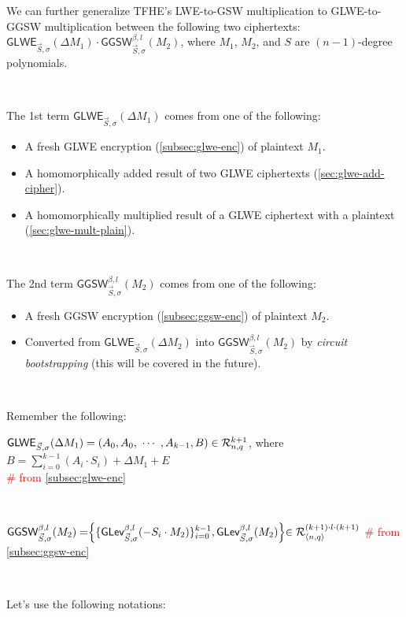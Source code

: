 We can further generalize TFHE's LWE-to-GSW multiplication to GLWE-to-GGSW multiplication between the following two ciphertexts: $\textsf{GLWE}_{\vec{S}, \sigma}(\Delta M_1) \cdot \textsf{GGSW}_{\vec{S}, \sigma}^{\beta, l}(M_2)$, where $M_1$, $M_2$, and $S$ are $(n-1)$-degree polynomials. 


$ $

\noindent The 1st term $\textsf{GLWE}_{\vec{S}, \sigma}(\Delta M_1)$ comes from one of the following: 
\begin{itemize}
\item A fresh GLWE encryption (\autoref{subsec:glwe-enc}) of plaintext $M_1$. 
\item A homomorphically added result of two GLWE ciphertexts (\autoref{sec:glwe-add-cipher}). 
\item A homomorphically multiplied result of a GLWE ciphertext with a plaintext (\autoref{sec:glwe-mult-plain}). 
\end{itemize}

$ $

\noindent The 2nd term $\textsf{GGSW}_{\vec{S}, \sigma}^{\beta, l}(M_2)$ comes from one of the following:
\begin{itemize}
\item A fresh GGSW encryption (\autoref{subsec:ggsw-enc}) of plaintext $M_2$.
\item Converted from $\textsf{GLWE}_{\vec{S}, \sigma}(\Delta M_2)$ into $\textsf{GGSW}_{\vec{S}, \sigma}^{\beta, l}(M_2)$ by \textit{circuit bootstrapping} (this will be covered in the future).
\end{itemize}

$ $

\noindent Remember the following: 

$\textsf{GLWE}_{\vec{S}, \sigma}(\Delta M_1) = (A_0, A_0, \text{ } \text{$\cdots$} \text{ }, A_{k-1}, B) \in \mathcal{R}_{n, q}^{k + 1}$, where $B = \sum\limits_{i=0}^{k-1}(A_i \cdot S_i) + \Delta M_1 + E$ \\ \textcolor{red}{\# from \autoref{subsec:glwe-enc}} 

$ $

$\textsf{GGSW}_{\vec{S}, \sigma}^{\beta, l}(M_2) = \Bigr \{ \{ \textsf{GLev}_{\vec{S}, \sigma}^{\beta, l} (-S_i \cdot M_2)  \}_{i=0}^{k-1}, \textsf{GLev}_{\vec{S}, \sigma}^{\beta, l}(M_2) \Bigl \} \in \mathcal{R}_{\langle n, q \rangle }^{(k+1) \cdot l \cdot (k+1)}$ \textcolor{red}{\# from \autoref{subsec:ggsw-enc}}

$ $

\noindent Let's use the following notations:


